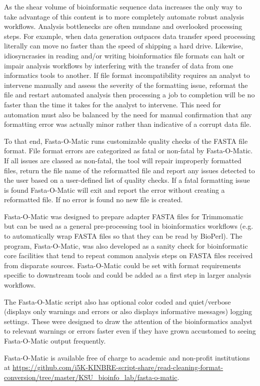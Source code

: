 As the shear volume of bioinformatic sequence data increases the only way to take advantage of this content is to more completely automate robust analysis workflows. Analysis bottlenecks are often mundane and overlooked processing steps. For example, when data generation outpaces data transfer speed processing literally can move no faster than the speed of shipping a hard drive. Likewise, idiosyncrasies in reading and/or writing bioinformatics file formats can halt or impair analysis workflows by interfering with the transfer of data from one informatics tools to another. If file format incompatibility requires an analyst to intervene manually and assess the severity of the formatting issue, reformat the file and restart automated analysis then processing a job to completion will be no faster than the time it takes for the analyst to intervene. This need for automation must also be balanced by the need for manual confirmation that any formatting error was actually minor rather than indicative of a corrupt data file. 

To that end, Fasta-O-Matic runs customizable quality checks of the FASTA file format. File format errors are categorized as fatal or non-fatal by Fasta-O-Matic.  If all issues are classed as non-fatal, the tool will repair improperly formatted files, return the file name of the reformatted file and report any issues detected to the user based on a user-defined list of quality checks. If a fatal formatting issue is found Fasta-O-Matic will exit and report the error without creating a reformatted file. If no error is found no new file is created.

Fasta-O-Matic was designed to prepare adapter FASTA files for Trimmomatic but can be used as a general pre-processing tool in bioinformatics workflows (e.g. to automatically wrap FASTA files so that they can be read by BioPerl). The program, Fasta-O-Matic, was also developed as a sanity check for bioinformatic core facilities that tend to repeat common analysis steps on FASTA files received from disparate sources. Fasta-O-Matic could be set with format requirements specific to downstream tools and could be added as a first step in larger analysis workflows.

The Fasta-O-Matic script also has optional color coded and quiet/verbose (displays only warnings and errors or also displays informative messages) logging settings. These were designed to draw the attention of the bioinformatics analyst to relevant warnings or errors faster even if they have grown accustomed to seeing Fasta-O-Matic output frequently.

Fasta-O-Matic is available free of charge to academic and non-profit institutions at \url{https://github.com/i5K-KINBRE-script-share/read-cleaning-format-conversion/tree/master/KSU\_bioinfo\_lab/fasta-o-matic}.
  
  
  